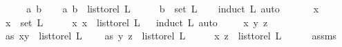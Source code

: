 \begin{isabellebody}
\isanewline
{}\isamarkupfalse%
\ \isanewline
\ \ \isamarkupfalse%
\ a\ b\isanewline
\ \ \isamarkupfalse%
\ {\isachardoublequoteopen}{\isacharparenleft}{\kern0pt}a{\isacharcomma}{\kern0pt}\ b{\isacharparenright}{\kern0pt}\ {\isasymin}\ list{\isacharunderscore}{\kern0pt}to{\isacharunderscore}{\kern0pt}rel\ L{\isachardoublequoteclose}\isanewline
\ \ \isamarkupfalse%
\ \isamarkupfalse%
\ {\isachardoublequoteopen}b\ {\isasymin}\ set\ L{\isachardoublequoteclose}\ \isanewline
\ \ \isamarkupfalse%
{\isacharparenleft}{\kern0pt}induct\ L{\isacharcomma}{\kern0pt}\ auto{\isacharparenright}{\kern0pt}\ \isamarkupfalse%
\isanewline
{}\isamarkupfalse%
\ \isanewline
\ \ \isamarkupfalse%
\ x\ \isanewline
\ \ \isamarkupfalse%
\ {\isachardoublequoteopen}x\ {\isasymin}\ set\ L{\isachardoublequoteclose}\isanewline
\ \ \isamarkupfalse%
\ \isamarkupfalse%
\ {\isachardoublequoteopen}{\isacharparenleft}{\kern0pt}x{\isacharcomma}{\kern0pt}\ x{\isacharparenright}{\kern0pt}\ {\isasymin}\ list{\isacharunderscore}{\kern0pt}to{\isacharunderscore}{\kern0pt}rel\ L{\isachardoublequoteclose}\isanewline
\ \ \isamarkupfalse%
{\isacharparenleft}{\kern0pt}induct\ L{\isacharcomma}{\kern0pt}\ auto{\isacharparenright}{\kern0pt}\ \isamarkupfalse%
\isanewline
{}\isamarkupfalse%
\isanewline
\ \ \isamarkupfalse%
\ x\ y\ z\ \isanewline
\ \ \isamarkupfalse%
\ as{}{\isacharcolon}{\kern0pt}\ {\isachardoublequoteopen}{\isacharparenleft}{\kern0pt}x{\isacharcomma}{\kern0pt}y{\isacharparenright}{\kern0pt}\ {\isasymin}\ list{\isacharunderscore}{\kern0pt}to{\isacharunderscore}{\kern0pt}rel\ L{\isachardoublequoteclose}\isanewline
\ \ \ \ as{}{\isacharcolon}{\kern0pt}\ {\isachardoublequoteopen}{\isacharparenleft}{\kern0pt}y{\isacharcomma}{\kern0pt}\ z{\isacharparenright}{\kern0pt}\ {\isasymin}\ list{\isacharunderscore}{\kern0pt}to{\isacharunderscore}{\kern0pt}rel\ L{\isachardoublequoteclose}\isanewline
\ \ \isamarkupfalse%
\ \isamarkupfalse%
\ {\isachardoublequoteopen}{\isacharparenleft}{\kern0pt}x{\isacharcomma}{\kern0pt}\ z{\isacharparenright}{\kern0pt}\ {\isasymin}\ list{\isacharunderscore}{\kern0pt}to{\isacharunderscore}{\kern0pt}rel\ L{\isachardoublequoteclose}\isanewline
\ \ \ \ \isamarkupfalse%
\ assms\isanewline
\ \ \isamarkupfalse%

\end{isabellebody}

